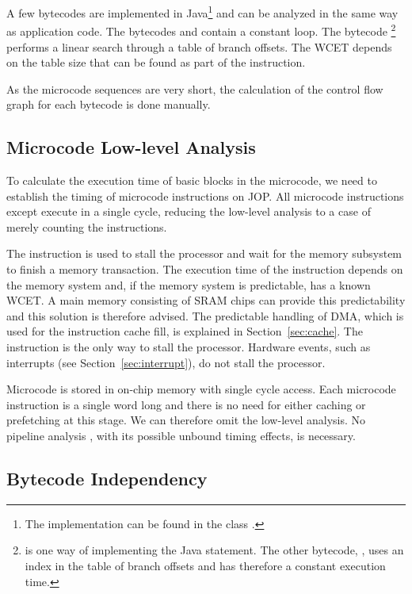 A few bytecodes are implemented in Java\footnote{The implementation
can be found in the class .} and can be
analyzed in the same way as application code. The bytecodes
 and  contain a constant loop. The bytecode
\footnote{ is one way of
implementing the Java  statement. The other
bytecode, , uses an index in the table of
branch offsets and has therefore a constant execution time.} performs
a linear search through a table of branch offsets. The WCET depends
on the table size that can be found as part of the instruction.

As the microcode sequences are very short, the calculation of the
control flow graph for each bytecode is done manually.

\subsection{Microcode Low-level Analysis}

To calculate the execution time of basic blocks in the microcode, we
need to establish the timing of microcode instructions on JOP. All
microcode instructions except  execute in a single cycle,
reducing the low-level analysis to a case of merely counting the
instructions.

The  instruction is used to stall the processor and wait
for the memory subsystem to finish a memory transaction. The
execution time of the  instruction depends on the memory
system and, if the memory system is predictable, has a known WCET. A
main memory consisting of SRAM chips can provide this predictability
and this solution is therefore advised. The predictable handling of
DMA, which is used for the instruction cache fill, is explained in
Section~\ref{sec:cache}. The  instruction is the only way
to stall the processor. Hardware events, such as interrupts (see
Section~\ref{sec:interrupt}), do not stall the processor.

Microcode is stored in on-chip memory with single cycle access. Each
microcode instruction is a single word long and there is no need for
either caching or prefetching at this stage. We can therefore omit
the low-level analysis. No pipeline analysis \cite{EngblomPhD}, with
its possible unbound timing effects, is necessary.

\subsection{Bytecode Independency}

